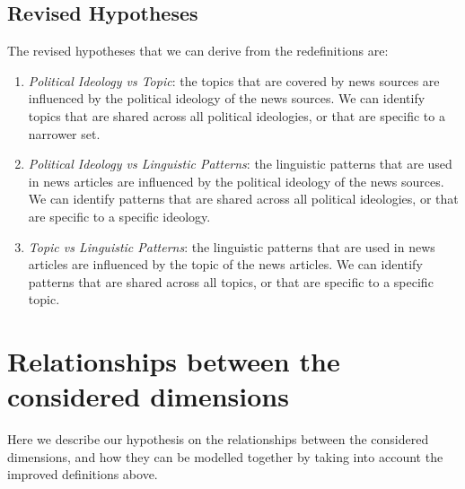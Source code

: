 \subsection{Revised Hypotheses}

The revised hypotheses that we can derive from the redefinitions are:

\begin{enumerate}
    \item \emph{Political Ideology vs Topic}: the topics that are covered by news sources are influenced by the political ideology of the news sources. We can identify topics that are shared across all political ideologies, or that are specific to a narrower set.
    \item \emph{Political Ideology vs Linguistic Patterns}: the linguistic patterns that are used in news articles are influenced by the political ideology of the news sources. We can identify patterns that are shared across all political ideologies, or that are specific to a specific ideology.
    \item \emph{Topic vs Linguistic Patterns}: the linguistic patterns that are used in news articles are influenced by the topic of the news articles. We can identify patterns that are shared across all topics, or that are specific to a specific topic.
\end{enumerate}


\section{Relationships between the considered dimensions}

Here we describe our hypothesis on the relationships between the considered dimensions, and how they can be modelled together by taking into account the improved definitions above.

